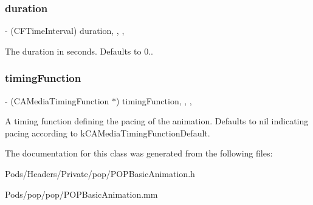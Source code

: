 \subsubsection{\texorpdfstring{duration}{duration}}
{\footnotesize\ttfamily -\/ (C\+F\+Time\+Interval) duration\hspace{0.3cm}{\ttfamily [read]}, {\ttfamily [write]}, {\ttfamily [nonatomic]}, {\ttfamily [assign]}}

The duration in seconds. Defaults to 0.. \mbox{\label{interface_p_o_p_basic_animation_a8cb9cd6eacafdebd129d93ee7b687b20}} 
\subsubsection{\texorpdfstring{timing\+Function}{timingFunction}}
{\footnotesize\ttfamily -\/ (C\+A\+Media\+Timing\+Function $\ast$) timing\+Function\hspace{0.3cm}{\ttfamily [read]}, {\ttfamily [write]}, {\ttfamily [nonatomic]}, {\ttfamily [strong]}}

A timing function defining the pacing of the animation. Defaults to nil indicating pacing according to k\+C\+A\+Media\+Timing\+Function\+Default. 

The documentation for this class was generated from the following files\+:\begin{DoxyCompactItemize}
\item 
Pods/\+Headers/\+Private/pop/P\+O\+P\+Basic\+Animation.\+h\item 
Pods/pop/pop/P\+O\+P\+Basic\+Animation.\+mm\end{DoxyCompactItemize}
